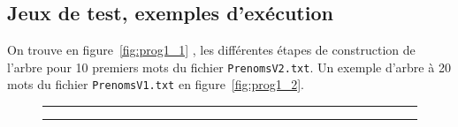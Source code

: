 \documentclass{article} %
\begin{document}
\subsection{Jeux de test, exemples d'exécution}
On trouve en figure~\ref{fig:prog1_1} , les différentes étapes de construction de l'arbre pour 10 premiers mots du fichier \texttt{PrenomsV2.txt}. Un exemple d'arbre à 20 mots du fichier \texttt{PrenomsV1.txt} en figure~\ref{fig:prog1_2}.

\begin{figure}[p]
  
  \begin{center}
    \rule{\linewidth}{.5pt}
     \vline
     \vline
     \rule{\linewidth}{.5pt} %

\end{center}
\end{figure}
\end{document}
